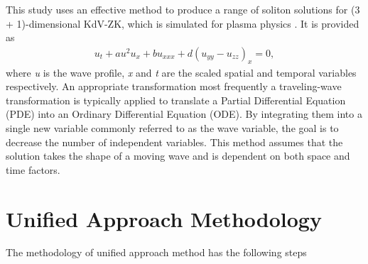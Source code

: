 \documentclass[10pt]{NSP1}
\numberwithin{equation}{section}
\begin{document}
This study uses an effective method to produce a range of soliton solutions for (3 + 1)-dimensional KdV-ZK, which is simulated for plasma physics \cite{b42,b43}. It is provided as
\begin{eqnarray}\label{KDVZK}
u_{t}+a u^2 u_{x}+b u_{xxx}+d(u_{yy}-u_{zz})_{x}=0,
\end{eqnarray}
where \emph{u} is the wave profile, \emph{x} and \emph{t} are the scaled spatial and temporal variables respectively. An appropriate transformation most frequently a traveling-wave transformation is typically applied to translate a Partial Differential Equation (PDE) into an Ordinary Differential Equation (ODE). By integrating them into a single new variable commonly referred to as the wave variable, the goal is to decrease the number of independent variables. This method assumes that the solution takes the shape of a moving wave and is dependent on both space and time factors.
\section{Unified Approach Methodology }
The methodology of unified approach method has the following steps
\end{document}
